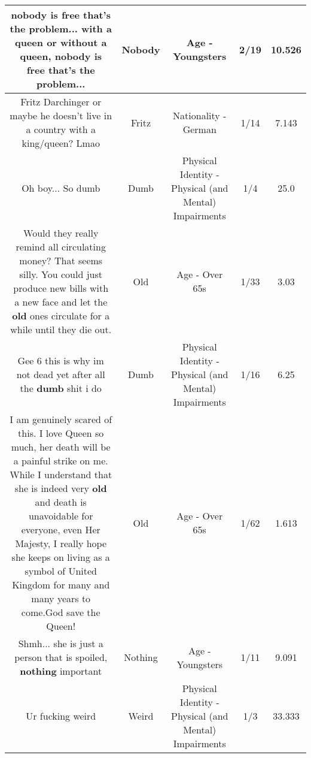 \documentclass[11pt]{article}
\newlength\mylength
\begin{document}
\begin{center}
\begin{longtable}{|C{.65\mylength}|C{.30\mylength}|C{.12\mylength}|C{.12\mylength}|C{.12\mylength}|}
  \small nobody is free that's the problem... with a queen or without a queen, \textbf{nobody} is free that's the problem...\normalsize   & Nobody & Age - Youngsters & 2/19 & 10.526 \\  \hline
  \small Fritz Darchinger or maybe he doesn't live in a country with a king/queen? Lmao\normalsize   & Fritz & Nationality - German & 1/14 & 7.143 \\  \hline
  \small Oh boy... So dumb\normalsize   & Dumb & Physical Identity - Physical (and Mental) Impairments & 1/4 & 25.0 \\  \hline
  \small Would they really remind all circulating money? That seems silly. You could just produce new bills with a new face and let the \textbf{old} ones circulate for a while until they die out.\normalsize   & Old & Age - Over 65s & 1/33 & 3.03 \\  \hline
  \small Gee 6 this is why im not dead yet after all the \textbf{dumb} shit i do\normalsize   & Dumb & Physical Identity - Physical (and Mental) Impairments & 1/16 & 6.25 \\  \hline
  \small I am genuinely scared of this. I love Queen so much, her death will be a painful strike on me. While I understand that she is indeed very \textbf{old} and death is unavoidable for everyone, even Her Majesty, I really hope she keeps on living as a symbol of United Kingdom for many and many years to come.God save the Queen!\normalsize   & Old & Age - Over 65s & 1/62 & 1.613 \\  \hline
  \small Shmh... she is just a person that is spoiled, \textbf{nothing} important\normalsize   & Nothing & Age - Youngsters & 1/11 & 9.091 \\  \hline
  \small Ur fucking weird\normalsize   & Weird & Physical Identity - Physical (and Mental) Impairments & 1/3 & 33.333 \\  \hline

\end{longtable}
\end{center}
\end{document}
